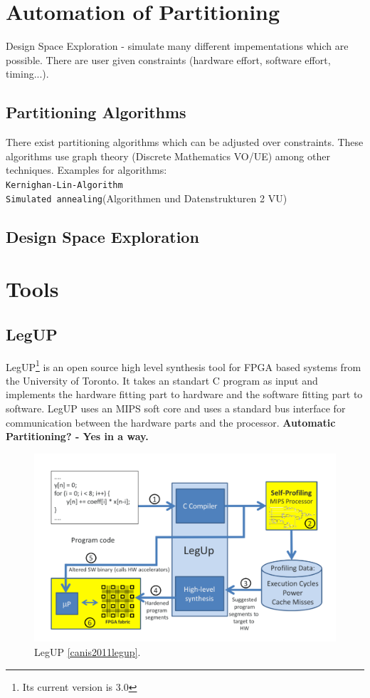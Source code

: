 \documentclass{article}
\begin{document}
	\section{Automation of Partitioning}
	  
	  Design Space Exploration - simulate many different impementations which are possible. There are user given constraints (hardware effort, software effort, timing...).
	  \subsection{Partitioning Algorithms}
	    There exist partitioning algorithms which can be adjusted over constraints.
	    These algorithms use graph theory (Discrete Mathematics VO/UE) among other techniques.
	    Examples for algorithms: \\
	     \texttt{Kernighan-Lin-Algorithm}\\
	     \texttt{Simulated annealing}(Algorithmen und Datenstrukturen 2 VU)
	     
	  \subsection{Design Space Exploration}
	    
	  
	\section{Tools}	  
	  \subsection{LegUP}
	  LegUP\footnote{Its current version is 3.0} is an open source high level synthesis tool for FPGA based systems from the University of Toronto. 
	  It takes an standart C program as input and implements the hardware fitting part to hardware and the software fitting part to software.
	  LegUP uses an MIPS soft core and uses a standard bus interface for communication between the hardware parts and the processor.  
	  \textbf{Automatic Partitioning? - Yes in a way.}
	  
	    \begin{figure}[hp]
	      \centering
	      \includegraphics[scale=0.2]{../pictures/legup.pdf}
	      \caption{LegUP \ref{canis2011legup}.}
	      \label{fig:legup}
	    \end{figure}
	  
\end{document}
